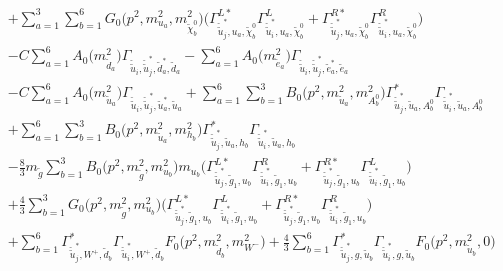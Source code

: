 \begin{itemize}
\begin{align}
 &+\sum_{a=1}^{3}\sum_{b=1}^{6}{G_0\Big(p^{2},m^2_{u_{{a}}},m^2_{\tilde{\chi}^0_{{b}}}\Big)} \Big({\Gamma^{L*}_{\check{\tilde{u}}^*_{{j}},u_{{a}},\tilde{\chi}^0_{{b}}}} {\Gamma^L_{\check{\tilde{u}}^*_{{i}},u_{{a}},\tilde{\chi}^0_{{b}}}}  + {\Gamma^{R*}_{\check{\tilde{u}}^*_{{j}},u_{{a}},\tilde{\chi}^0_{{b}}}} {\Gamma^R_{\check{\tilde{u}}^*_{{i}},u_{{a}},\tilde{\chi}^0_{{b}}}} \Big)\nonumber \\ 
 &- C \sum_{a=1}^{6}{A_0\Big(m^2_{\tilde{d}_{{a}}}\Big)} {\Gamma_{\check{\tilde{u}}_{{i}},\check{\tilde{u}}^*_{{j}},\tilde{d}^*_{{a}},\tilde{d}_{{a}}}}  - \sum_{a=1}^{6}{A_0\Big(m^2_{\tilde{e}_{{a}}}\Big)} {\Gamma_{\check{\tilde{u}}_{{i}},\check{\tilde{u}}^*_{{j}},\tilde{e}^*_{{a}},\tilde{e}_{{a}}}}  \nonumber \\ 
 &- C \sum_{a=1}^{6}{A_0\Big(m^2_{\tilde{u}_{{a}}}\Big)} {\Gamma_{\check{\tilde{u}}_{{i}},\check{\tilde{u}}^*_{{j}},\tilde{u}^*_{{a}},\tilde{u}_{{a}}}}  +\sum_{a=1}^{6}\sum_{b=1}^{3}{B_0\Big(p^{2},m^2_{\tilde{u}_{{a}}},m^2_{A^0_{{b}}}\Big)} {\Gamma^*_{\check{\tilde{u}}^*_{{j}},\tilde{u}_{{a}},A^0_{{b}}}} {\Gamma_{\check{\tilde{u}}^*_{{i}},\tilde{u}_{{a}},A^0_{{b}}}} \nonumber \\ 
 &+\sum_{a=1}^{6}\sum_{b=1}^{3}{B_0\Big(p^{2},m^2_{\tilde{u}_{{a}}},m^2_{h_{{b}}}\Big)} {\Gamma^*_{\check{\tilde{u}}^*_{{j}},\tilde{u}_{{a}},h_{{b}}}} {\Gamma_{\check{\tilde{u}}^*_{{i}},\tilde{u}_{{a}},h_{{b}}}} \nonumber \\ 
 &-\frac{8}{3} m_{\tilde{g}} \sum_{b=1}^{3}{B_0\Big(p^{2},m^2_{\tilde{g}},m^2_{u_{{b}}}\Big)} m_{u_{{b}}} \Big({\Gamma^{L*}_{\check{\tilde{u}}^*_{{j}},\tilde{g}_{{1}},u_{{b}}}} {\Gamma^R_{\check{\tilde{u}}^*_{{i}},\tilde{g}_{{1}},u_{{b}}}}  + {\Gamma^{R*}_{\check{\tilde{u}}^*_{{j}},\tilde{g}_{{1}},u_{{b}}}} {\Gamma^L_{\check{\tilde{u}}^*_{{i}},\tilde{g}_{{1}},u_{{b}}}} \Big) \nonumber \\ 
 &+\frac{4}{3} \sum_{b=1}^{3}{G_0\Big(p^{2},m^2_{\tilde{g}},m^2_{u_{{b}}}\Big)} \Big({\Gamma^{L*}_{\check{\tilde{u}}^*_{{j}},\tilde{g}_{{1}},u_{{b}}}} {\Gamma^L_{\check{\tilde{u}}^*_{{i}},\tilde{g}_{{1}},u_{{b}}}}  + {\Gamma^{R*}_{\check{\tilde{u}}^*_{{j}},\tilde{g}_{{1}},u_{{b}}}} {\Gamma^R_{\check{\tilde{u}}^*_{{i}},\tilde{g}_{{1}},u_{{b}}}} \Big) \nonumber \\ 
 &+\sum_{b=1}^{6}{\Gamma^*_{\check{\tilde{u}}^*_{{j}},W^+,\tilde{d}_{{b}}}} {\Gamma_{\check{\tilde{u}}^*_{{i}},W^+,\tilde{d}_{{b}}}} {F_0\Big(p^{2},m^2_{\tilde{d}_{{b}}},m^2_{W^-}\Big)} +\frac{4}{3} \sum_{b=1}^{6}{\Gamma^*_{\check{\tilde{u}}^*_{{j}},g,\tilde{u}_{{b}}}} {\Gamma_{\check{\tilde{u}}^*_{{i}},g,\tilde{u}_{{b}}}} {F_0\Big(p^{2},m^2_{\tilde{u}_{{b}}},0\Big)}  \nonumber \\ 

\end{align}
\end{itemize}

